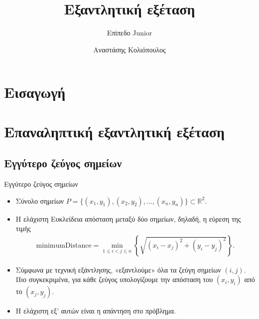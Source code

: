 \documentclass[t,aspectratio=169,9pt]{beamer}
\title{Εξαντλητική εξέταση}
\subtitle{Επίπεδο Junior}
\author{Αναστάσης Κολιόπουλος}
\date{}
\begin{document}
\pdptitleframe                 %

\section{Εισαγωγή}        %

\section{Επαναληπτική εξαντλητική εξέταση}

\subsection{Εγγύτερο ζεύγος σημείων}
\begin{frame}{Εγγύτερο ζεύγος σημείων}
    \begin{itemize}
        \pause
        \item Σύνολο σημείων $P = \{(x_{1}, y_{1}), (x_{2}, y_{2}), \dots, (x_{n}, y_{n}) \}\subset \mathbb{R}^{2}$.
    \end{itemize}
    \pause
    \begin{itemize}
        \pause
        \item Η ελάχιστη Ευκλείδεια απόσταση μεταξύ δύο σημείων, δηλαδή, η εύρεση της τιμής 
        \begin{align*}
            \text{minimumDistance} = \min_{1 \leq i < j \leq n}\left\{\sqrt{(x_{i} - x_{j})^{2} + (y_{i} - y_{j})^{2}}\right\}.
        \end{align*}
    \end{itemize}
    \pause
    \begin{itemize}
        \pause 
        \item Σύμφωνα με τεχνική εξάντλησης, «εξαντλούμε» όλα τα ζεύγη σημείων $(i, j)$. Πιο συγκεκριμένα, για κάθε ζεύγος
        υπολογίζουμε την απόσταση του $(x_i, y_i)$ από το $(x_j, y_j)$.
        \pause 
        \item Η ελάχιστη εξ' αυτών είναι η απάντηση στο πρόβλημα.
    \end{itemize}
\end{frame}
\end{document}

